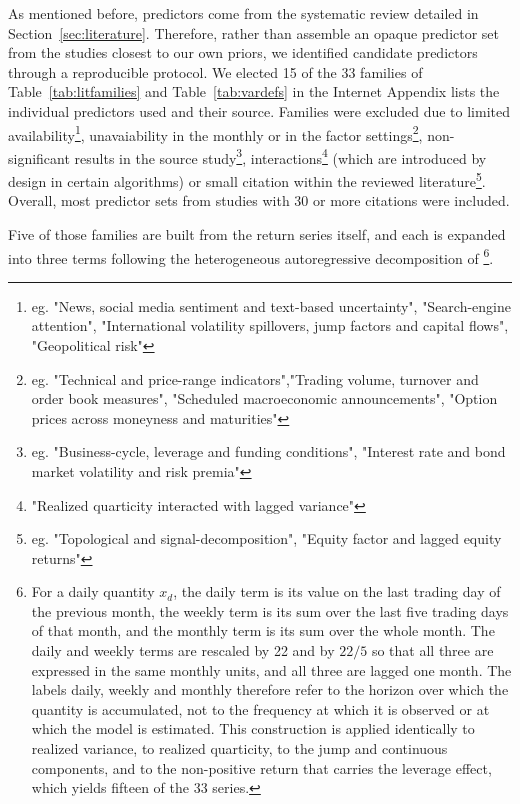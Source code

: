 \documentclass[preprint,12pt,authoryear]{elsarticle}
\begin{document}
As mentioned before, predictors come from the systematic review detailed in Section~\ref{sec:literature}. Therefore, rather than assemble an opaque predictor set from the studies closest to our own priors, we identified candidate predictors through a reproducible protocol. We elected 15 of the 33 families of Table~\ref{tab:litfamilies} and Table~\ref{tab:vardefs} in the Internet Appendix lists the individual predictors used and their source. Families were excluded due to limited availability\footnote{eg. "News, social media sentiment and text-based uncertainty", "Search-engine attention", "International volatility spillovers, jump factors and capital flows", "Geopolitical risk"}, unavaiability in the monthly or in the factor settings\footnote{eg. "Technical and price-range indicators","Trading volume, turnover and order book measures", "Scheduled macroeconomic announcements", "Option prices across moneyness and maturities"}, non-significant results in the source study\footnote{eg. "Business-cycle, leverage and funding conditions", "Interest rate and bond market volatility and risk premia"}, interactions\footnote{"Realized quarticity interacted with lagged variance"} (which are introduced by design in certain algorithms) or small citation within the reviewed literature\footnote{eg. "Topological and signal-decomposition", "Equity factor and lagged equity returns"}. Overall, most predictor sets from studies with 30 or more citations were included.

Five of those families are built from the return series itself, and each is expanded into three terms following the heterogeneous autoregressive decomposition of \citet{corsi2009}\footnote{For a daily quantity $x_{d}$, the daily term is its value on the last trading day of the previous month, the weekly term is its sum over the last five trading days of that month, and the monthly term is its sum over the whole month. The daily and weekly terms are rescaled by 22 and by $22/5$ so that all three are expressed in the same monthly units, and all three are lagged one month. The labels daily, weekly and monthly therefore refer to the horizon over which the quantity is accumulated, not to the frequency at which it is observed or at which the model is estimated. This construction is applied identically to realized variance, to realized quarticity, to the jump and continuous components, and to the non-positive return that carries the leverage effect, which yields fifteen of the 33 series.}. 
\end{document}
